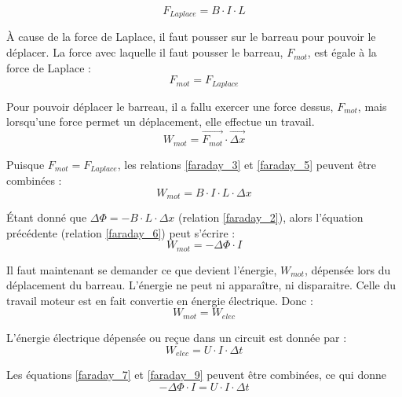 \begin{equation}\label{faraday_3}
    F_{Laplace} = B \cdot I \cdot L
\end{equation}

À cause de la force de Laplace, il faut pousser sur le barreau pour pouvoir le déplacer. La force avec laquelle il faut pousser le barreau, \(F_{mot}\), est égale à la force de Laplace :
\begin{equation}\label{faraday_4}
    F_{mot}= F_{Laplace}
\end{equation}

Pour pouvoir déplacer le barreau, il a fallu exercer une force dessus, \(F_{mot}\), mais lorsqu'une force permet un déplacement, elle effectue un travail.
\begin{equation}\label{faraday_5}
    W_{mot} = \vec{F_{mot}} \cdot \vec{\Delta x}
\end{equation}

Puisque \(F_{mot} = F_{Laplace}\), les relations \ref{faraday_3} et \ref{faraday_5} peuvent être combinées :
\begin{equation}\label{faraday_6}
    W_{mot} = B \cdot I \cdot L \cdot \Delta x
\end{equation}

Étant donné que \(\Delta \Phi = - B \cdot L \cdot \Delta x \) (relation \ref{faraday_2}),  alors l'équation précédente (relation \ref{faraday_6}) peut s'écrire :
\begin{equation}\label{faraday_7}
    W_{mot} = - \Delta \Phi \cdot I
\end{equation}

Il faut maintenant se demander ce que devient l'énergie, \(W_{mot}\), dépensée lors du déplacement du barreau. L'énergie ne peut ni apparaître, ni disparaitre. Celle du travail moteur est en fait convertie en énergie électrique. Donc :
\begin{equation}\label{faraday_8}
    W_{mot}=W_{elec}
\end{equation}

L'énergie électrique dépensée ou reçue dans un circuit est donnée par :
\begin{equation}\label{faraday_9}
    W_{elec}=U \cdot I \cdot \Delta t
\end{equation}

Les équations \ref{faraday_7} et \ref{faraday_9} peuvent être combinées, ce qui donne
\begin{equation}
    - \Delta \Phi \cdot I = U \cdot I \cdot \Delta t
\end{equation}

